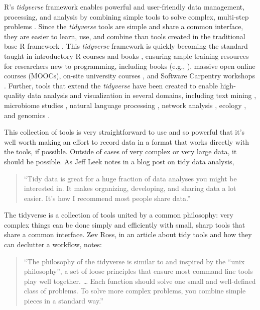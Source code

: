 \documentclass[]{tufte-book}
\begin{document}
R's \emph{tidyverse} framework enables powerful and user-friendly data management,
processing, and analysis by combining simple tools to solve complex, multi-step
problems \citep{ross2017declutter, silge2016tidytext, wickham2016ggplot2, wickham2016r}. Since the \emph{tidyverse} tools are simple and share a common
interface, they are easier to learn, use, and combine than tools created in the
traditional base R framework \citep{ross2017declutter, lowndes2017our, mcnamara2016state}. This \emph{tidyverse} framework is quickly becoming the standard
taught in introductory R courses and books \citep{hicks2017guide, baumer2015data, kaplan2018teaching, stander2017enthusing, mcnamara2016state}, ensuring ample training resources for researchers new to
programming, including books (e.g., \citep{baumer2017modern, lifesciencesR, wickham2016r}), massive open online courses (MOOCs), on-site university courses
\citep{baumer2015data, kaplan2018teaching, stander2017enthusing}, and Software
Carpentry workshops \citep{wilson2014software, pawlik2017developing}. Further, tools
that extend the \emph{tidyverse} have been created to enable high-quality data
analysis and visualization in several domains, including text mining
\citep{silge2017text}, microbiome studies \citep{mcmurdie2013phyloseq}, natural language
processing \citep{RJ-2017-035}, network analysis \citep{RJ-2017-023}, ecology
\citep{hsieh2016inext}, and genomics \citep{yin2012ggbio}.

This collection of tools is very straightforward to use and so powerful that
it's well worth making an effort to record data in a format that works directly
with the tools, if possible. Outside of cases of very complex or very large
data, it should be possible. As Jeff Leek notes in a blog post on tidy data
analysis,

\begin{quote}
``Tidy data is great for a huge fraction of data analyses you might
be interested in. It makes organizing, developing, and sharing data a lot
easier. It's how I recommend most people share data.'' \citep{leek2017toward}
\end{quote}

The tidyverse is a collection of tools united by a common philosophy: very complex
things can be done simply and efficiently with small, sharp tools that share a
common interface. Zev Ross, in an article about tidy tools and how they can
declutter a workflow, notes:

\begin{quote}
``The philosophy of the tidyverse is similar to
and inspired by the ``unix philosophy'', a set of loose principles that ensure
most command line tools play well together. \ldots{} Each function should solve one
small and well-defined class of problems. To solve more complex problems, you
combine simple pieces in a standard way.'' \citep{ross2017declutter}
\end{quote}
\end{document}
